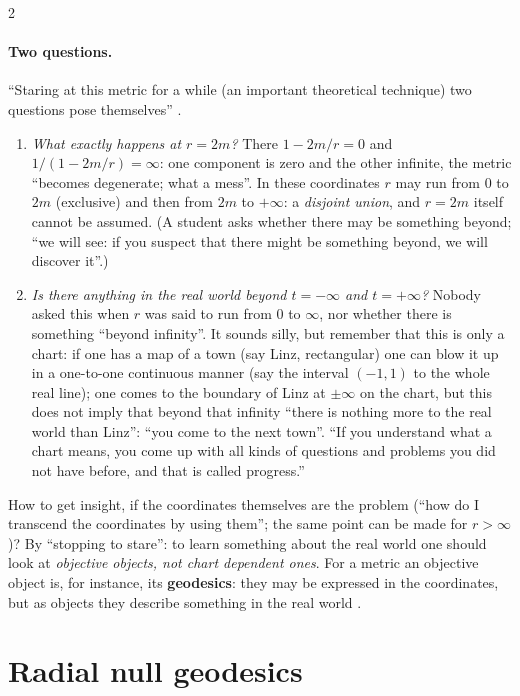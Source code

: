 \begin{paracol}{2}
\paragraph{Two questions.} ``Staring at this metric for a while (an important theoretical technique) two questions pose themselves'' .
\begin{enumerate}
  \item \emph{What exactly happens at $r=2m$?} There $1-2m/r=0$ and $1/(1-2m/r)=\infty$: one component is zero and the other infinite, the metric ``becomes degenerate; what a mess''. In these coordinates $r$ may run from $0$ to $2m$ (exclusive) and then from $2m$ to $+\infty$: a \emph{disjoint union}, and $r=2m$ itself cannot be assumed. (A student asks whether there may be something beyond; ``we will see: if you suspect that there might be something beyond, we will discover it''.) 
  \item \emph{Is there anything in the real world beyond $t=-\infty$ and $t=+\infty$?} Nobody asked this when $r$ was said to run from $0$ to $\infty$, nor whether there is something ``beyond infinity''. It sounds silly, but remember that this is only a chart: if one has a map of a town (say Linz, rectangular) one can blow it up in a one-to-one continuous manner (say the interval $(-1,1)$ to the whole real line); one comes to the boundary of Linz at $\pm\infty$ on the chart, but this does not imply that beyond that infinity ``there is nothing more to the real world than Linz'': ``you come to the next town''. ``If you understand what a chart means, you come up with all kinds of questions and problems you did not have before, and that is called progress.'' 
\end{enumerate}
How to get insight, if the coordinates themselves are the problem (``how do I transcend the coordinates by using them''; the same point can be made for $r>\infty$)? By ``stopping to stare'': to learn something about the real world one should look at \emph{objective objects, not chart dependent ones}. For a metric an objective object is, for instance, its \textbf{geodesics}: they may be expressed in the coordinates, but as objects they describe something in the real world .

\section{Radial null geodesics}\label{sec:c22-null}


\end{paracol}
